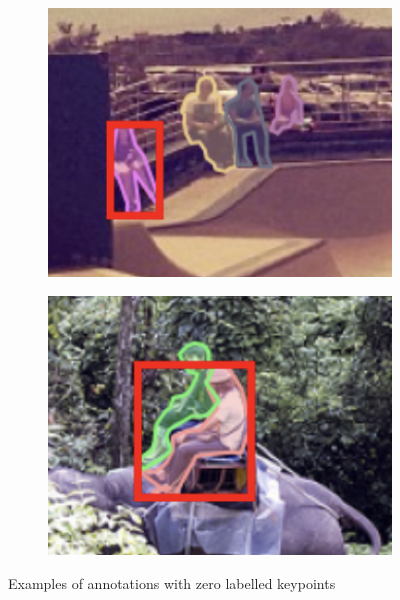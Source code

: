 \documentclass[11pt, letterpaper]{article}
\begin{document}
\begin{figure}[h]
    \centering
    \begin{subfigure}{0.4\linewidth}
        \includegraphics[width=\textwidth]{zero_kp_skatepark.png}
    \end{subfigure}
    \begin{subfigure}{0.4\linewidth}
        \includegraphics[width=\textwidth]{zero_kp_elephant.png}
    \end{subfigure}
    \caption{Examples of annotations with zero labelled keypoints}
    \label{fig:zero_kp_images}
\end{figure}
\end{document}

